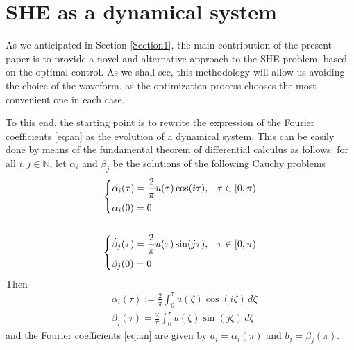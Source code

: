 \section{SHE as a dynamical system}\label{Section3}

As we anticipated in Section \ref{Section1}, the main contribution of the present paper is to provide a novel and alternative approach to the SHE problem, based on the optimal control. As we shall see, this methodology will allow us avoiding the choice of the waveform, as the optimization process chooses the most convenient one in each case. 

To this end, the starting point is to rewrite the expression of the Fourier coefficients \eqref{eq:an} as the evolution of a dynamical system. This can be easily done by means of the fundamental theorem of differential calculus as follows: for all $i,j\in\mathbb{N}$, let $\alpha_i$ and $\beta_j$ be the solutions of the following Cauchy problems
\begin{align}\label{eq:Cauchy}
	\begin{cases} 
		\displaystyle\dot{\alpha_i}(\tau)  = \frac{2}{\pi}u(\tau)\cos(i\tau), & \tau\in [0,\pi) 
		\\[6pt]  
		\alpha_i(0)  = 0       
	\end{cases} \notag 
	\\
	\\
	\begin{cases} 
		\displaystyle\dot{\beta}_j(\tau)  = \frac{2}{\pi}u(\tau)\sin(j\tau), & \tau\in [0,\pi) 
		\\[6pt]  
		\beta_j(0) = 0       
	\end{cases}\notag
\end{align}
Then 
\begin{align*}
	&\alpha_i(\tau):= \frac{2}{\pi}\int_0^\tau u(\zeta) \cos(i\zeta)\,d\zeta 
	\\[5pt]
	&\beta_j(\tau) = \frac{2}{\pi}\int_0^\tau u(\zeta) \sin(j\zeta)\,d\zeta 
\end{align*}
and the Fourier coefficients \eqref{eq:an} are given by $a_i=\alpha_i(\pi)$ and $b_j=\beta_j(\pi)$.  

